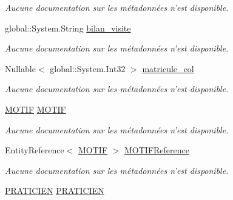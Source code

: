 \begin{DoxyCompactItemize}
\begin{DoxyCompactList}\small\item\em Aucune documentation sur les métadonnées n'est disponible. \end{DoxyCompactList}\item 
global\-::\-System.\-String \hyperlink{class_model_1_1_r_a_p_p_o_r_t___d_e___v_i_s_i_t_e_a916f42e4c755e24452e9037997dfbb35}{bilan\-\_\-visite}
\begin{DoxyCompactList}\small\item\em Aucune documentation sur les métadonnées n'est disponible. \end{DoxyCompactList}\item 
Nullable$<$ global\-::\-System.\-Int32 $>$ \hyperlink{class_model_1_1_r_a_p_p_o_r_t___d_e___v_i_s_i_t_e_aad653ab33335adde420671e5af84cbce}{matricule\-\_\-col}
\begin{DoxyCompactList}\small\item\em Aucune documentation sur les métadonnées n'est disponible. \end{DoxyCompactList}\item 
\hyperlink{class_model_1_1_m_o_t_i_f}{M\-O\-T\-I\-F} \hyperlink{class_model_1_1_r_a_p_p_o_r_t___d_e___v_i_s_i_t_e_abb54ed863ff048a69698fcf9e4b7665c}{M\-O\-T\-I\-F}
\begin{DoxyCompactList}\small\item\em Aucune documentation sur les métadonnées n'est disponible. \end{DoxyCompactList}\item 
Entity\-Reference$<$ \hyperlink{class_model_1_1_m_o_t_i_f}{M\-O\-T\-I\-F} $>$ \hyperlink{class_model_1_1_r_a_p_p_o_r_t___d_e___v_i_s_i_t_e_addf9ad62b216faa0ee68ff497faac083}{M\-O\-T\-I\-F\-Reference}
\begin{DoxyCompactList}\small\item\em Aucune documentation sur les métadonnées n'est disponible. \end{DoxyCompactList}\item 
\hyperlink{class_model_1_1_p_r_a_t_i_c_i_e_n}{P\-R\-A\-T\-I\-C\-I\-E\-N} \hyperlink{class_model_1_1_r_a_p_p_o_r_t___d_e___v_i_s_i_t_e_ac30bad0961e26f2899f13d860c4d5f65}{P\-R\-A\-T\-I\-C\-I\-E\-N}

\end{DoxyCompactItemize}
